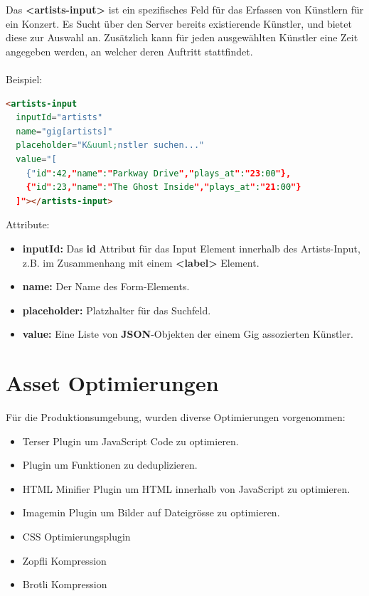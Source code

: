 Das \textbf{<artists-input>} ist ein spezifisches Feld für das Erfassen von
Künstlern für ein Konzert. Es Sucht über den Server bereits existierende
Künstler, und bietet diese zur Auswahl an. Zusätzlich kann für jeden
ausgewählten Künstler eine Zeit angegeben werden, an welcher deren Auftritt
stattfindet.\\
\\
\noindent{}Beispiel:

\begin{lstlisting}[language=html,frame=single]
<artists-input
  inputId="artists"
  name="gig[artists]"
  placeholder="K&uuml;nstler suchen..."
  value="[
    {"id":42,"name":"Parkway Drive","plays_at":"23:00"},
    {"id":23,"name":"The Ghost Inside","plays_at":"21:00"}
  ]"></artists-input>
\end{lstlisting}

\noindent{}Attribute:
\begin{itemize}
  \tightlist{}
  \item{} \textbf{inputId:} Das \textbf{id} Attribut für das Input Element innerhalb des Artists-Input, z.B. im Zusammenhang mit einem \textbf{<label>} Element.
  \item{} \textbf{name:} Der Name des Form-Elements.
  \item{} \textbf{placeholder:} Platzhalter für das Suchfeld.
  \item{} \textbf{value:} Eine Liste von \textbf{JSON}-Objekten der einem Gig assozierten Künstler.
\end{itemize}

\clearpage
\section{Asset Optimierungen}

Für die Produktionsumgebung, wurden diverse Optimierungen vorgenommen:

\begin{itemize}
  \tightlist{}
  \item{} Terser Plugin um JavaScript Code zu optimieren.
  \item{} Plugin um Funktionen zu deduplizieren.
  \item{} HTML Minifier Plugin um HTML innerhalb von JavaScript zu optimieren.
  \item{} Imagemin Plugin um Bilder auf Dateigrösse zu optimieren.
  \item{} CSS Optimierungsplugin
  \item{} Zopfli Kompression
  \item{} Brotli Kompression
\end{itemize}


